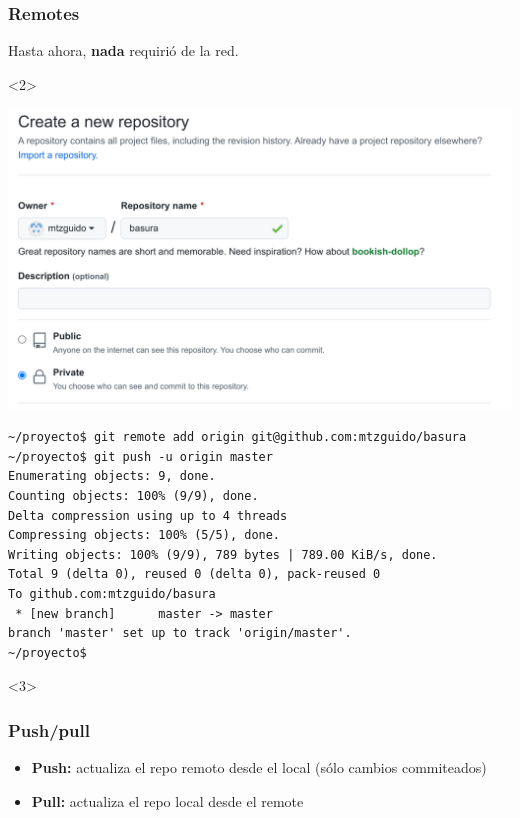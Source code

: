 \documentclass[a4paper, 12pt, aspectratio=169,
\ifhandout handout \else \fi
]{beamer}
\begin{document}
\begin{frame}[fragile]
    \frametitle{Remotes}
    Hasta ahora, \textbf{nada} requirió de la red.
    \pause
            \begin{minipage}[t][8cm]{\textwidth}
    \begin{onlyenv}<2>
    \begin{center}
    \includegraphics[keepaspectratio, height=0.8\textheight, width=\linewidth]{basura.png}
    \end{center}
    \end{onlyenv}
    \begin{lstlisting}[basicstyle=\ttfamily\footnotesize]
~/proyecto$ git remote add origin git@github.com:mtzguido/basura
~/proyecto$ git push -u origin master
Enumerating objects: 9, done.
Counting objects: 100% (9/9), done.
Delta compression using up to 4 threads
Compressing objects: 100% (5/5), done.
Writing objects: 100% (9/9), 789 bytes | 789.00 KiB/s, done.
Total 9 (delta 0), reused 0 (delta 0), pack-reused 0
To github.com:mtzguido/basura
 * [new branch]      master -> master
branch 'master' set up to track 'origin/master'.
~/proyecto$
    \end{lstlisting}
    \begin{onlyenv}<3>
    \end{onlyenv}
            \end{minipage}
\end{frame}

\begin{frame}
    \frametitle{Push/pull}
    \begin{itemize}
        \item \textbf{Push:} actualiza el repo remoto desde el local (sólo cambios commiteados)
        \item \textbf{Pull:} actualiza el repo local desde el remote
    \end{itemize}
\end{frame}
\end{document}
